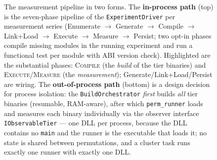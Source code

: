 \begin{nurlang}
\begin{figure}[htbp]
\caption{The measurement pipeline in two forms. The \textbf{in-process path} (top) is the seven-phase
pipeline of the \texttt{ExperimentDriver} per measurement series (Enumerate $\to$ Generate $\to$ Compile
$\to$ Link+Load $\to$ Execute $\to$ Measure $\to$ Persist; two opt-in phases compile missing modules in
the running experiment and run a functional test per module with ABI version check). Highlighted are the
substantial phases: \textsc{Compile} (the \emph{build} of the tier binaries) and
\textsc{Execute}/\textsc{Measure} (the \emph{measurement}); Generate/Link+Load/Persist are wiring. The
\textbf{out-of-process path} (bottom) is a design decision for process isolation: the
\texttt{BuildOrchestrator} \emph{first} builds \emph{all} tier binaries (resumable, RAM-aware), after
which \texttt{perm\_runner} loads and measures each binary individually via the observer interface
\texttt{IObservableTier} --- one DLL per process, because the DLL contains no \texttt{main} and the
runner is the executable that loads it; no state is shared between permutations, and a cluster task
runs exactly one runner with exactly one DLL.}\label{fig:pipeline}
\end{figure}
\begin{figure}[htbp]\centering
\begin{tikzpicture}[font=\footnotesize,>=Stealth,align=center,
  tool/.style={draw,rounded corners,fill=blue!6,minimum height=0.7cm,minimum width=3.4cm,inner sep=5pt,font=\ttfamily\scriptsize}]

\end{tikzpicture}
\end{figure}
\end{nurlang}
